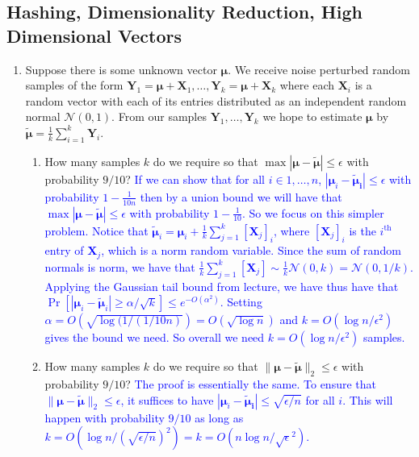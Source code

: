 \documentclass[10pt]{article}
\newcommand{\bs}[1]{\boldsymbol{#1}}
\newcommand{\bv}[1]{\mathbf{#1}}
\begin{document}
\subsection{Hashing, Dimensionality Reduction, High Dimensional Vectors}
\begin{enumerate}
	\item Suppose there is some unknown vector $\bs{\mu}$. We receive noise perturbed random samples of the form $\bv{Y}_1 = \bs{\mu} + \bv{X}_1, \ldots, \bv{Y}_k = \bs{\mu} + \bv{X}_k$ where each $\bv{X}_i$ is a random vector with each of its entries distributed as an independent random normal $\mathcal{N}(0,1)$. From our samples $\bv{Y}_1, \ldots, \bv{Y}_k$ we hope to estimate $\bs{\mu}$ by $\bs{\tilde{\mu}} = \frac{1}{k}\sum_{i=1}^k \bv{Y}_i$. 
	\begin{enumerate}
		\item How many samples $k$ do we require so that $\max|\bs{\mu} -\bs{\tilde{\mu}} | \leq \epsilon$ with probability $9/10$?
		\textcolor{blue}{If we can show that for all $i\in 1, \ldots, n$, $|\bs{\mu}_i -\bs{\tilde{\mu}_i} | \leq \epsilon$ with probability $1 - \frac{1}{10n}$ then by a union bound we will have that $\max|\bs{\mu} -\bs{\tilde{\mu}}| \leq \epsilon$ with probability $1 - \frac{1}{10}$. So we focus on this simpler problem. Notice that $\bs{\tilde{\mu}}_i = \bs{{\mu}}_i + \frac{1}{k}\sum_{j=1}^k[\bv{X}_j]_i$, where $[\bv{X}_j]_i$ is the $i^\text{th}$ entry of $\bv{X}_j$, which is a norm random variable. Since the sum of random normals is norm, we have that $\frac{1}{k}\sum_{j=1}^k[\bv{X}_j] \sim \frac{1}{k}\mathcal{N}(0,k) = \mathcal{N}(0,1/k)$. Applying the Gaussian tail bound from lecture, we have thus have that $\Pr[|\bs{\mu}_i - \bs{\tilde{\mu}}_i| \geq \alpha/\sqrt{k}] \leq e^{-O(\alpha^2)}$. Setting $\alpha = O(\sqrt{\log(1/(1/10n)}) =  O(\sqrt{\log n})$ and $k = O({\log n}/\epsilon^2)$ gives the bound we need. So overall we need $k = O({\log n}/\epsilon^2)$ samples. }
		
		\item How many samples $k$ do we require so that $\|\bs{\mu} -\bs{\tilde{\mu}}\|_2 \leq \epsilon$ with probability $9/10$?
		\textcolor{blue}{The proof is essentially the same. To ensure that $\|\bs{\mu} -\bs{\tilde{\mu}}\|_2 \leq \epsilon$, it suffices to have $|\bs{\mu}_i -\bs{\tilde{\mu}_i} | \leq \sqrt{\epsilon/n}$ for all $i$. This will happen with probability $9/10$ as long as  $k = O({\log n}/(\sqrt{\epsilon/n})^2) = k = O(n {\log n}/\sqrt{\epsilon}^2).$
		}
		

\end{enumerate}
\end{enumerate}
\end{document}

